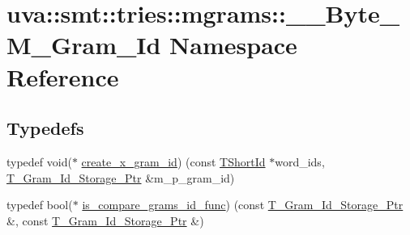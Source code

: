 \hypertarget{namespaceuva_1_1smt_1_1tries_1_1mgrams_1_1_____byte___m___gram___id}{}\section{uva\+:\+:smt\+:\+:tries\+:\+:mgrams\+:\+:\+\_\+\+\_\+\+Byte\+\_\+\+M\+\_\+\+Gram\+\_\+\+Id Namespace Reference}
\label{namespaceuva_1_1smt_1_1tries_1_1mgrams_1_1_____byte___m___gram___id}
\subsection*{Typedefs}
\begin{DoxyCompactItemize}
\item 
typedef void($\ast$ \hyperlink{namespaceuva_1_1smt_1_1tries_1_1mgrams_1_1_____byte___m___gram___id_a1c1aae2c6557d3d99cd055f0d41ba4a6}{create\+\_\+x\+\_\+gram\+\_\+id}) (const \hyperlink{namespaceuva_1_1smt_1_1hashing_adcf22e1982ad09d3a63494c006267469}{T\+Short\+Id} $\ast$word\+\_\+ids, \hyperlink{namespaceuva_1_1smt_1_1tries_1_1mgrams_1_1_m___gram___id_a478e6468dbd5dab37599c566d77c845c}{T\+\_\+\+Gram\+\_\+\+Id\+\_\+\+Storage\+\_\+\+Ptr} \&m\+\_\+p\+\_\+gram\+\_\+id)
\item 
typedef bool($\ast$ \hyperlink{namespaceuva_1_1smt_1_1tries_1_1mgrams_1_1_____byte___m___gram___id_a9a549c7e7bb18c13c4a8f8af3f39e426}{is\+\_\+compare\+\_\+grams\+\_\+id\+\_\+func}) (const \hyperlink{namespaceuva_1_1smt_1_1tries_1_1mgrams_1_1_m___gram___id_a478e6468dbd5dab37599c566d77c845c}{T\+\_\+\+Gram\+\_\+\+Id\+\_\+\+Storage\+\_\+\+Ptr} \&, const \hyperlink{namespaceuva_1_1smt_1_1tries_1_1mgrams_1_1_m___gram___id_a478e6468dbd5dab37599c566d77c845c}{T\+\_\+\+Gram\+\_\+\+Id\+\_\+\+Storage\+\_\+\+Ptr} \&)
\end{DoxyCompactItemize}
